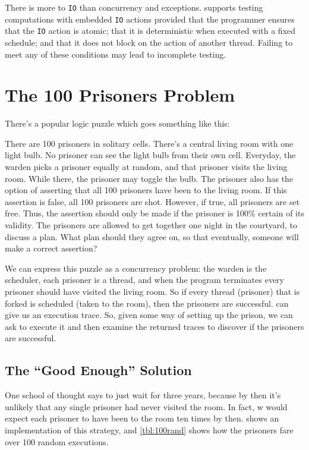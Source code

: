 There is more to \verb|IO| than concurrency and exceptions.  \dejafu{} supports
testing computations with embedded \verb|IO| actions provided that the
programmer ensures that the \verb|IO| action is atomic; that it is deterministic
when executed with a fixed schedule; and that it does not block on the action of
another thread.  Failing to meet any of these conditions may lead to incomplete
testing.

\section{The 100 Prisoners Problem}
\label{sec:dejafu-100}

There's a popular logic puzzle which goes something like this:

\begin{displayquote}
  There are 100 prisoners in solitary cells.  There's a central living
  room with one light bulb.  No prisoner can see the light bulb from
  their own cell.  Everyday, the warden picks a prisoner equally at
  random, and that prisoner visits the living room.  While there, the
  prisoner may toggle the bulb.  The prisoner also has the option of
  asserting that all 100 prisoners have been to the living room.  If
  this assertion is false, all 100 prisoners are shot.  However, if
  true, all prisoners are set free.  Thus, the assertion should only
  be made if the prisoner is 100\% certain of its validity.  The
  prisoners are allowed to get together one night in the courtyard, to
  discuss a plan.  What plan should they agree on, so that eventually,
  someone will make a correct assertion?
\end{displayquote}

We can express this puzzle as a concurrency problem: the warden is the
scheduler, each prisoner is a thread, and when the program terminates
every prisoner should have visited the living room.  So if every
thread (prisoner) that is forked is scheduled (taken to the room),
then the prisoners are successful.  \dejafu{} can give us an execution
trace.  So, given some way of setting up the prison, we can ask
\dejafu{} to execute it and then examine the returned traces to
discover if the prisoners are successful.

\subsection{The ``Good Enough'' Solution}

One school of thought says to just wait for three years, because by
then it's unlikely that any single prisoner had never visited the
room.  In fact, w would expect each prisoner to have been to the room
ten times by then.   shows an implementation of this
strategy, and \cref{tbl:100rand} shows how the prisoners fare over 100
random executions.

